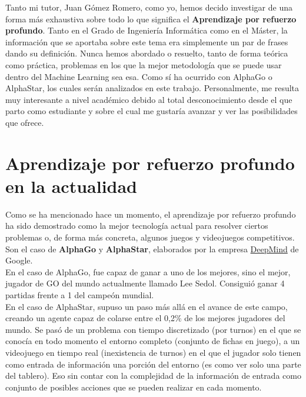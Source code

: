 \documentclass[11pt,fleqn]{book} %
\begin{document}
Tanto mi tutor, Juan Gómez Romero, como yo, hemos decido investigar de una forma más exhaustiva sobre todo lo que significa el \textbf{Aprendizaje por refuerzo profundo}. Tanto en el Grado de Ingeniería Informática como en el Máster, la información que se aportaba sobre este tema era simplemente un par de frases dando su definición. Nunca hemos abordado o resuelto, tanto de forma teórica como práctica, problemas en los que la mejor metodología que se puede usar dentro del Machine Learning sea esa. Como sí ha ocurrido con AlphaGo o AlphaStar, los cuales serán analizados en este trabajo. Personalmente, me resulta muy interesante a nivel académico debido al total desconocimiento desde el que parto como estudiante y sobre el cual me gustaría avanzar y ver las posibilidades que ofrece.

\section{Aprendizaje por refuerzo profundo en la actualidad}\label{sec:DRL2}

Como se ha mencionado hace un momento, el aprendizaje por refuerzo profundo ha sido demostrado como la mejor tecnología actual para resolver ciertos problemas o, de forma más concreta, algunos juegos y videojuegos competitivos. Son el caso de \textbf{AlphaGo} y \textbf{AlphaStar}, elaborados por la empresa \href{https://deepmind.com/}{DeepMind} de Google.\cite{article:DeepMind} \\

En el caso de AlphaGo, fue capaz de ganar a uno de los mejores, sino el mejor, jugador de GO del mundo actualmente llamado Lee Sedol. Consiguió ganar 4 partidas frente a 1 del campeón mundial.\cite{article:leesedol} \cite{article:leesedol2} \\

En el caso de AlphaStar, supuso un paso más allá en el avance de este campo, creando un agente capaz de colarse entre el 0,2\% de los mejores jugadores del mundo. Se pasó de un problema con tiempo discretizado (por turnos) en el que se conocía en todo momento el entorno completo (conjunto de fichas en juego), a un videojuego en tiempo real (inexistencia de turnos) en el que el jugador solo tienen como entrada de información una porción del entorno (es como ver solo una parte del tablero). Eso sin contar con la complejidad de la información de entrada como conjunto de posibles acciones que se pueden realizar en cada momento.\cite{article:vinyals} \cite{article:vinyals2} \\
\end{document}

